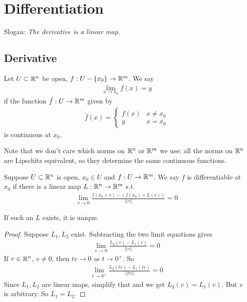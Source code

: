 \documentclass[a4paper]{article}
\begin{document}
\newpage

\section{Differentiation}
Slogan: \emph{The derivative is a linear map}.

\subsection{Derivative}
\begin{defi}
Let $U\subset \mathbb{R}^n$ be open, $f:U-\left\{x_0\right\}\to \mathbb{R}^m$. We say
\begin{equation*}
\begin{aligned}
\lim_{x\to x_0} f\left(x\right)=y
\end{aligned}
\end{equation*}
if the function $\bar{f}:U \to \mathbb{R}^m$ given by
\begin{equation*}
\begin{aligned}
\bar{f}\left(x\right) = \left\{\begin{array}{ll}
f\left(x\right) & x \neq x_0\\
y & x=x_0
\end{array}\right.
\end{aligned}
\end{equation*}
is continuous at $x_0$.

Note that we don't care which norms on $\mathbb{R}^n$ or $\mathbb{R}^m$ we use: all the norms on $\mathbb{R}^n$ are Lipschitz equivalent, so they determine the same continuous functions.
\end{defi}

\begin{defi}
Suppose $U \subset \mathbb{R}^n$ is open, $x_0 \in U$ and $f:U\to \mathbb{R}^m$. We say $f$ is differentiable at $x_0$ if there is a linear map $L:\mathbb{R}^n \to \mathbb{R}^m$ s.t.
\begin{equation*}
\begin{aligned}
\lim_{v\to 0} \frac{f\left(x_0+v\right)-(f(x_0)+L(v))}{||v||} = 0
\end{aligned}
\end{equation*}
\end{defi}

If such an $L$ exists, it is unique.
\begin{proof}
Suppose $L_1,L_2$ exist. Subtracting the two limit equations gives
\begin{equation*}
\begin{aligned}
\lim_{v \to 0} \frac{L_2(v)-L_1(v)}{||v||} = 0
\end{aligned}
\end{equation*}
If $v \in \mathbb{R}^n$, $v\neq 0$, then $tv \to 0$ as $t\to 0^+$. So
\begin{equation*}
\begin{aligned}
\lim_{t\to 0^+} \frac{L_2(tv)-L_1(tv)}{||tv||} = 0
\end{aligned}
\end{equation*}
Since $L_1,L_2$ are linear maps, simplify that and we get $L_2(v)=L_1(v)$. But $v$ is arbitrary. So $L_1=L_2$.
\end{proof}
\end{document}
